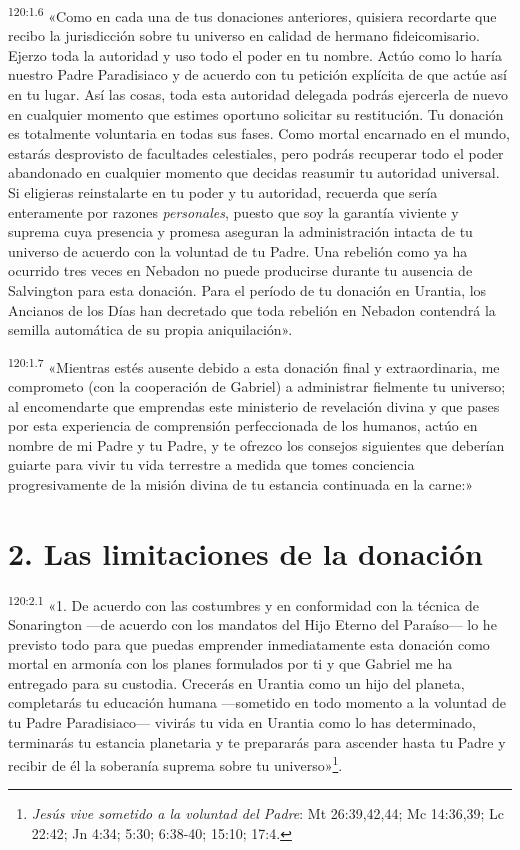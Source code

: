 \par
\textsuperscript{120:1.6} «Como en cada una de tus donaciones anteriores, quisiera recordarte que recibo la jurisdicción sobre tu universo en calidad de hermano fideicomisario. Ejerzo toda la autoridad y uso todo el poder en tu nombre. Actúo como lo haría nuestro Padre Paradisiaco y de acuerdo con tu petición explícita de que actúe así en tu lugar. Así las cosas, toda esta autoridad delegada podrás ejercerla de nuevo en cualquier momento que estimes oportuno solicitar su restitución. Tu donación es totalmente voluntaria en todas sus fases. Como mortal encarnado en el mundo, estarás desprovisto de facultades celestiales, pero podrás recuperar todo el poder abandonado en cualquier momento que decidas reasumir tu autoridad universal. Si eligieras reinstalarte en tu poder y tu autoridad, recuerda que sería enteramente por razones \textit{personales}, puesto que soy la garantía viviente y suprema cuya presencia y promesa aseguran la administración intacta de tu universo de acuerdo con la voluntad de tu Padre. Una rebelión como ya ha ocurrido tres veces en Nebadon no puede producirse durante tu ausencia de Salvington para esta donación. Para el período de tu donación en Urantia, los Ancianos de los Días han decretado que toda rebelión en Nebadon contendrá la semilla automática de su propia aniquilación».

\par
\textsuperscript{120:1.7} «Mientras estés ausente debido a esta donación final y extraordinaria, me comprometo (con la cooperación de Gabriel) a administrar fielmente tu universo; al encomendarte que emprendas este ministerio de revelación divina y que pases por esta experiencia de comprensión perfeccionada de los humanos, actúo en nombre de mi Padre y tu Padre, y te ofrezco los consejos siguientes que deberían guiarte para vivir tu vida terrestre a medida que tomes conciencia progresivamente de la misión divina de tu estancia continuada en la carne:»

\section*{2. Las limitaciones de la donación}
\par
\textsuperscript{120:2.1} «1. De acuerdo con las costumbres y en conformidad con la técnica de Sonarington ---de acuerdo con los mandatos del Hijo Eterno del Paraíso--- lo he previsto todo para que puedas emprender inmediatamente esta donación como mortal en armonía con los planes formulados por ti y que Gabriel me ha entregado para su custodia. Crecerás en Urantia como un hijo del planeta, completarás tu educación humana ---sometido en todo momento a la voluntad de tu Padre Paradisiaco--- vivirás tu vida en Urantia como lo has determinado, terminarás tu estancia planetaria y te prepararás para ascender hasta tu Padre y recibir de él la soberanía suprema sobre tu universo»\footnote{\textit{Jesús vive sometido a la voluntad del Padre}: Mt 26:39,42,44; Mc 14:36,39; Lc 22:42; Jn 4:34; 5:30; 6:38-40; 15:10; 17:4.}.

